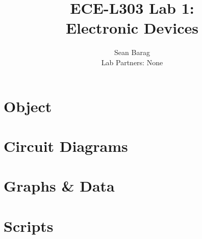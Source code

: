 \documentclass{article}
\title{ECE-L303 Lab 1: \\ Electronic Devices}
\author{Sean Barag \\ Lab Partners: None}
\date{}
\begin{document}


\thispagestyle{empty}
\newpage
\mbox{}

\maketitle
\setcounter{page}{1} %
\tableofcontents %

\newpage %
\section{Object}


\section{Circuit Diagrams}


\section{Graphs \& Data}


\newpage
\appendix
\section{Scripts}
\end{document}
